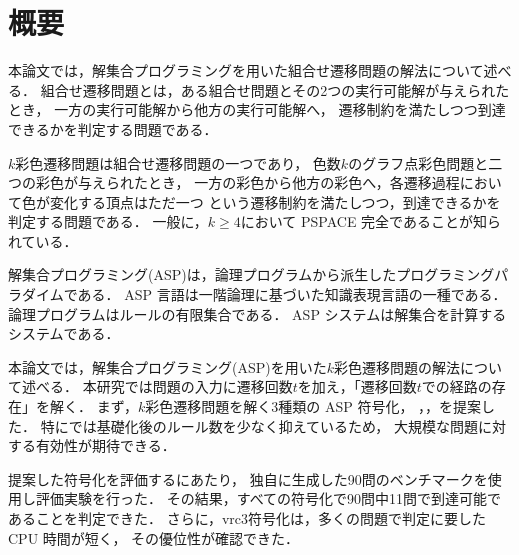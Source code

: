 \chapter*{概要}

本論文では，解集合プログラミングを用いた組合せ遷移問題の解法について述べる．
組合せ遷移問題とは，ある組合せ問題とその2つの実行可能解が与えられたとき，
一方の実行可能解から他方の実行可能解へ，
遷移制約を満たしつつ到達できるかを判定する問題である．

$k$彩色遷移問題は組合せ遷移問題の一つであり，
色数$k$のグラフ点彩色問題と二つの彩色が与えられたとき，
一方の彩色から他方の彩色へ，各遷移過程において色が変化する頂点はただ一つ
という遷移制約を満たしつつ，到達できるかを判定する問題である．
一般に，$k \ge 4$において PSPACE 完全であることが知られている．

解集合プログラミング(ASP)は，論理プログラムから派生したプログラミングパラダイムである．
ASP 言語は一階論理に基づいた知識表現言語の一種である．
論理プログラムはルールの有限集合である．
ASP システムは解集合を計算するシステムである．

本論文では，解集合プログラミング(ASP)を用いた$k$彩色遷移問題の解法について述べる．
本研究では問題の入力に遷移回数$t$を加え，「遷移回数$t$での経路の存在」を解く．
まず，$k$彩色遷移問題を解く3種類の ASP 符号化，
，，を提案した．
特にでは基礎化後のルール数を少なく抑えているため，
大規模な問題に対する有効性が期待できる．

提案した符号化を評価するにあたり，
独自に生成した90問のベンチマークを使用し評価実験を行った．
その結果，すべての符号化で90問中11問で到達可能であることを判定できた．
さらに，\textsf{vrc3}符号化は，多くの問題で判定に要した CPU 時間が短く，
その優位性が確認できた．

